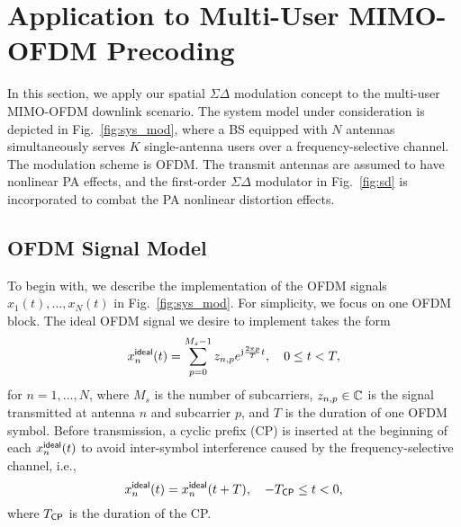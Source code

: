 \documentclass[10pt,twocolumn,twoside]{IEEEtran}
\begin{document}
\section{Application to Multi-User MIMO-OFDM Precoding}
\label{sec:application}

In this section, we apply our spatial $\Sigma \Delta$ modulation concept to the multi-user MIMO-OFDM downlink scenario.
The system model under consideration is depicted in Fig.~\ref{fig:sys_mod}, where
a BS equipped with $N$ antennas simultaneously serves $K$ single-antenna users over a frequency-selective channel.
The modulation scheme is OFDM.
The transmit antennas are assumed to have nonlinear PA effects, and the first-order $\Sigma \Delta$ modulator in Fig.~\ref{fig:sd} is incorporated to combat the PA nonlinear distortion effects.









\subsection{OFDM Signal Model}

To begin with, we describe the implementation of the OFDM signals $x_1(t), \dots, x_N(t)$ in Fig.~\ref{fig:sys_mod}.
For simplicity, we focus on one OFDM block.
The ideal OFDM signal we desire to implement takes the form
\begin{equation}\label{eq:OFDM_sig_ideal}
	x^{\sf ideal}_n(t) =  \sum_{p=0}^{M_s-1} z_{n,p} e^{{\mathfrak j}  \frac{2\pi p}{T}t}, \quad  0 \le t < T,
\end{equation}
for $n=1,\dots,N$,
where
$M_s$ is the number of subcarriers,
$z_{n,p} \in \mathbb{C}$ is the signal transmitted at antenna $n$ and subcarrier $p$,
and $T$ is the duration of one OFDM symbol.
Before transmission, a cyclic prefix (CP) is inserted at the beginning of each $x^{\sf ideal}_n(t)$ to avoid inter-symbol interference caused by the frequency-selective channel, i.e.,
\begin{equation}\label{eq:OFDM_sig_ideal_cp}
	x^{\sf ideal}_n(t) = x^{\sf ideal}_n(t+T), \quad -T_{\sf CP} \le t < 0,
\end{equation}
where $T_{\sf CP}$ is the duration of the CP.
\end{document}
